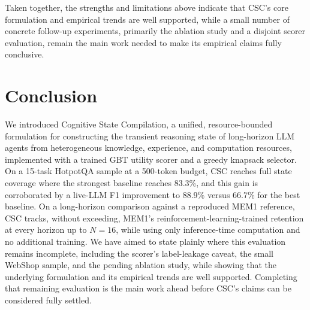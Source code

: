\documentclass{article}
\begin{document}
Taken together, the strengths and limitations above indicate that CSC's core formulation and empirical trends are well supported, while a small number of concrete follow-up experiments, primarily the ablation study and a disjoint scorer evaluation, remain the main work needed to make its empirical claims fully conclusive.

\section{Conclusion}

We introduced Cognitive State Compilation, a unified, resource-bounded formulation for constructing the transient reasoning state of long-horizon LLM agents from heterogeneous knowledge, experience, and computation resources, implemented with a trained GBT utility scorer and a greedy knapsack selector. On a 15-task HotpotQA sample at a 500-token budget, CSC reaches full state coverage where the strongest baseline reaches 83.3\%, and this gain is corroborated by a live-LLM F1 improvement to 88.9\% versus 66.7\% for the best baseline. On a long-horizon comparison against a reproduced MEM1 reference, CSC tracks, without exceeding, MEM1's reinforcement-learning-trained retention at every horizon up to $N=16$, while using only inference-time computation and no additional training. We have aimed to state plainly where this evaluation remains incomplete, including the scorer's label-leakage caveat, the small WebShop sample, and the pending ablation study, while showing that the underlying formulation and its empirical trends are well supported. Completing that remaining evaluation is the main work ahead before CSC's claims can be considered fully settled.



\end{document}
